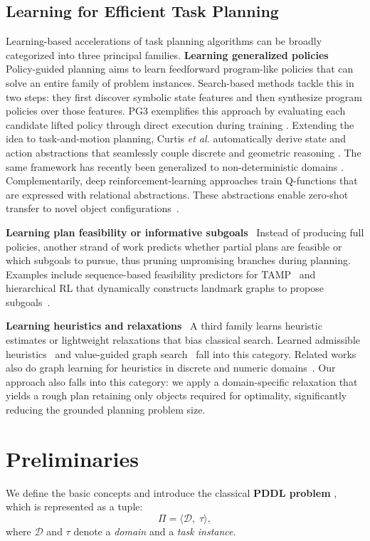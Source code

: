 \documentclass[letterpaper, 10pt, journal, twoside]{IEEEtran}
\newcommand{\myparagraph}[1]{\noindent\textbf{#1}~}
\begin{document}
\subsection{Learning for Efficient Task Planning}
\label{subsec:learn_eff}
Learning-based accelerations of task planning algorithms can be broadly categorized into three principal families.
\myparagraph{Learning generalized policies}
Policy-guided planning aims to learn feedforward program-like policies that can solve an entire family of problem instances.
Search-based methods tackle this in two steps: they first discover symbolic state features and then synthesize program policies over those features. 
PG3 exemplifies this approach by evaluating each candidate lifted policy through direct execution during training \cite{yang2022pg3}. Extending the idea to task-and-motion planning, Curtis \textit{et al.} automatically derive state and action abstractions that seamlessly couple discrete and geometric reasoning \cite{curtis2022discovering}. The same framework has recently been generalized to non-deterministic domains \cite{hofmann2024learning}.
Complementarily, deep reinforcement-learning approaches train Q-functions that are expressed with relational abstractions.
These abstractions enable zero-shot transfer to novel object configurations~\cite{karia2022relational}.

\myparagraph{Learning plan feasibility or informative subgoals}
Instead of producing full policies, another strand of work predicts whether partial plans are feasible or which subgoals to pursue, thus pruning unpromising branches during planning. Examples include sequence-based feasibility predictors for TAMP~\cite{yang2022sequence} and hierarchical RL that dynamically constructs landmark graphs to propose subgoals~\cite{zhang2023balancing}.

\myparagraph{Learning heuristics and relaxations}
A third family learns heuristic estimates or lightweight relaxations that bias classical search. Learned admissible heuristics~\cite{arfaee2011learning} and value-guided graph search~\cite{silver2016mastering} fall into this category. Related works also do graph learning for heuristics in discrete and numeric domains~\cite{silver2021planning,chen2024graph}. Our approach also falls into this category: we apply a domain-specific relaxation that yields a rough plan retaining only objects required for optimality, significantly reducing the grounded planning problem size.



\section{Preliminaries}
We define the basic concepts and introduce the classical %
\textbf{PDDL problem} \cite{fikes1971strips}, which is represented as a tuple:
\begin{equation}
\Pi = \langle \mathcal D,\;\tau  \rangle ,
\end{equation}
where $\mathcal D$ and $\tau$ denote a \textit{domain} and a \textit{task instance}.
\end{document}
